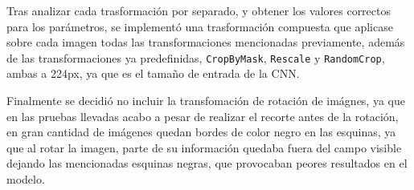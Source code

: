Tras analizar cada trasformación por separado, y obtener los valores correctos para los parámetros, se implementó una trasformación compuesta que aplicase sobre cada imagen todas las transformaciones mencionadas previamente, además de las transformaciones ya predefinidas, \texttt{CropByMask}, \texttt{Rescale} y \texttt{RandomCrop}, ambas a 224px, ya que es el tamaño de entrada de la CNN.\smallskip

Finalmente se decidió no incluir la transfomación de rotación de imágnes, ya que en las pruebas llevadas acabo a pesar de realizar el recorte antes de la rotación, en gran cantidad de imágenes quedan bordes de color negro en las esquinas, ya que al rotar la imagen, parte de su información quedaba fuera del campo visible dejando las mencionadas esquinas negras, que provocaban peores resultados en el modelo.